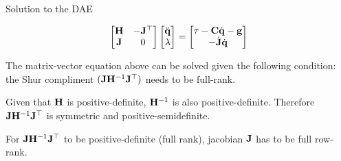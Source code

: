 \documentclass{beamer}
\begin{document}
\begin{frame}{Solution to the DAE}
	\begin{flushleft}
		
		\textcolor{mygrey}{
		\begin{equation}
			\begin{bmatrix}
				\mathbf{H} & -\mathbf{J}^\top \\
				\mathbf{J} & 0
			\end{bmatrix}
			\begin{bmatrix}
				\ddot{\mathbf{q}} \\
				\lambda
			\end{bmatrix}
			=
			\begin{bmatrix}
				\tau - \mathbf{C} \dot{\mathbf{q}} - \mathbf{g} \\
				-\dot{\mathbf{J}} \dot{\mathbf{q}}
			\end{bmatrix}
		\end{equation}
	}
		
		The matrix-vector equation above can be solved given the following condition: the Shur compliment $(\mathbf{J}\mathbf{H}^{-1}\mathbf{J}^\top)$ needs to be full-rank.
		
		\bigskip
		
		Given that $\mathbf{H}$ is positive-definite, $\mathbf{H}^{-1}$ is also positive-definite. Therefore $\mathbf{J}\mathbf{H}^{-1}\mathbf{J}^\top$ is symmetric and positive-semidefinite.
		
				\bigskip
				
		For $\mathbf{J}\mathbf{H}^{-1}\mathbf{J}^\top$ to be positive-definite (full rank), jacobian $\mathbf{J}$ has to be full row-rank.
		
				
	\end{flushleft}
\end{frame}
\end{document}
